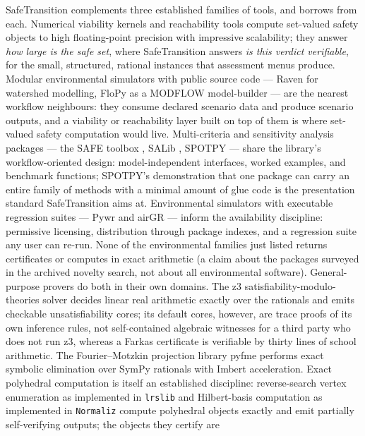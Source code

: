 \documentclass[3p,11pt]{elsarticle}
\begin{document}
SafeTransition complements three established families of tools, and borrows
from each. Numerical viability kernels and reachability tools compute
set-valued safety objects to high floating-point precision with
impressive scalability; they answer \emph{how large is the safe set},
where SafeTransition answers \emph{is this verdict verifiable}, for the
small, structured, rational instances that assessment menus produce.
Modular environmental simulators with public source code --- Raven
\citep{Craig2020} for watershed modelling, FloPy \citep{Bakker2016} as a
MODFLOW model-builder --- are the nearest workflow neighbours: they
consume declared scenario data and produce scenario outputs, and a
viability or reachability layer built on top of them is where set-valued
safety computation would live. Multi-criteria and sensitivity
analysis packages --- the SAFE toolbox \citep{Pianosi2015}, SALib
\citep{Herman2017}, SPOTPY \citep{Houska2015} --- share the library's
workflow-oriented design: model-independent interfaces, worked examples,
and benchmark functions; SPOTPY's demonstration that one package can carry
an entire family of methods with a minimal amount of glue code is the
presentation standard SafeTransition aims at. Environmental simulators
with executable regression suites --- Pywr \citep{Tomlinson2020} and
airGR \citep{Coron2017} --- inform the availability discipline:
permissive licensing, distribution through package indexes, and a
regression suite any user can re-run. None of the environmental
families just listed returns certificates or computes in exact
arithmetic (a claim about the packages surveyed in the archived novelty
search, not about all environmental software). General-purpose
provers do both in their own domains. The z3
satisfiability-modulo-theories solver \citep{deMoura2008} decides linear
real arithmetic exactly over the rationals and emits checkable
unsatisfiability cores; its default cores, however, are trace proofs of
its own inference rules, not self-contained algebraic witnesses for a
third party who does not run z3, whereas a Farkas certificate is
verifiable by thirty lines of school arithmetic. The Fourier--Motzkin
projection library pyfme \citep{Caron2022} performs exact symbolic
elimination over SymPy rationals with Imbert acceleration. Exact
polyhedral computation is itself an established discipline:
reverse-search vertex enumeration as implemented in \texttt{lrslib}
\citep{Avis2000} and Hilbert-basis computation as implemented in
\texttt{Normaliz} \citep{Bruns2010} compute polyhedral objects exactly
and emit partially self-verifying outputs; the objects they certify are
\end{document}
